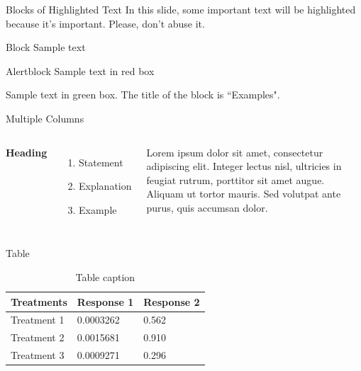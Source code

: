 \documentclass[aspectratio=169,xcolor=dvipsnames]{beamer}
\begin{document}

\begin{frame}{Blocks of Highlighted Text}
    In this slide, some important text will be \alert{highlighted} because it's important. Please, don't abuse it.

    \begin{block}{Block}
        Sample text
    \end{block}

    \begin{alertblock}{Alertblock}
        Sample text in red box
    \end{alertblock}

    \begin{examples}
        Sample text in green box. The title of the block is ``Examples".
    \end{examples}
\end{frame}


\begin{frame}{Multiple Columns}
    \begin{columns}[c] %

        \textbf{Heading}
        \begin{enumerate}
            \item Statement
            \item Explanation
            \item Example
        \end{enumerate}

        Lorem ipsum dolor sit amet, consectetur adipiscing elit. Integer lectus nisl, ultricies in feugiat rutrum, porttitor sit amet augue. Aliquam ut tortor mauris. Sed volutpat ante purus, quis accumsan dolor.

    \end{columns}
\end{frame}


\begin{frame}{Table}
    \begin{table}
        \begin{tabular}{l l l}
            \toprule
            \textbf{Treatments} & \textbf{Response 1} & \textbf{Response 2} \\
            \midrule
            Treatment 1         & 0.0003262           & 0.562               \\
            Treatment 2         & 0.0015681           & 0.910               \\
            Treatment 3         & 0.0009271           & 0.296               \\
            \bottomrule
        \end{tabular}
        \caption{Table caption}
    \end{table}
\end{frame}
\end{document}
